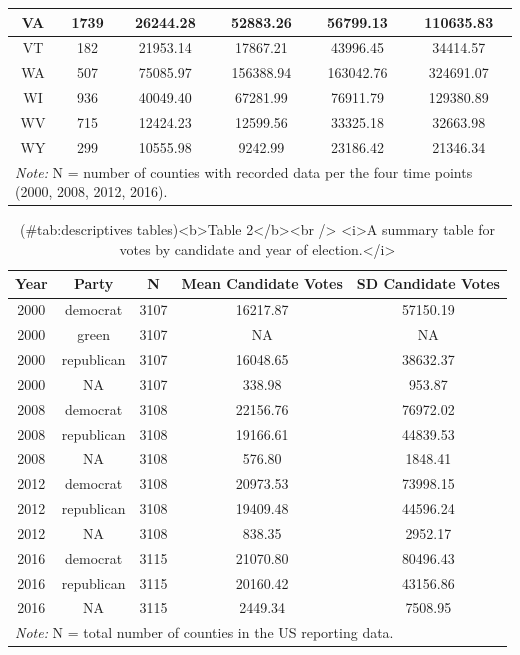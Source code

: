\documentclass[
  english,
  man]{apa6}
\begin{document}
\begin{table}
\begin{tabular}[t]{c|c|c|c|c|c}
VA & 1739 & 26244.28 & 52883.26 & 56799.13 & 110635.83\\
\hline
VT & 182 & 21953.14 & 17867.21 & 43996.45 & 34414.57\\
\hline
WA & 507 & 75085.97 & 156388.94 & 163042.76 & 324691.07\\
\hline
WI & 936 & 40049.40 & 67281.99 & 76911.79 & 129380.89\\
\hline
WV & 715 & 12424.23 & 12599.56 & 33325.18 & 32663.98\\
\hline
WY & 299 & 10555.98 & 9242.99 & 23186.42 & 21346.34\\
\hline
\multicolumn{6}{l}{\rule{0pt}{1em}\textit{Note: } N = number of counties with recorded data per the four time points (2000, 2008, 2012, 2016).}\\
\end{tabular}
\end{table}

\begin{table}

\caption{(\#tab:descriptives tables)<b>Table 2</b><br /> <i>A summary table for votes by candidate and year of election.</i>}
\centering
\begin{tabular}[t]{c|c|c|c|c}
\hline
Year & Party & N & Mean Candidate Votes & SD Candidate Votes\\
\hline
2000 & democrat & 3107 & 16217.87 & 57150.19\\
\hline
2000 & green & 3107 & NA & NA\\
\hline
2000 & republican & 3107 & 16048.65 & 38632.37\\
\hline
2000 & NA & 3107 & 338.98 & 953.87\\
\hline
2008 & democrat & 3108 & 22156.76 & 76972.02\\
\hline
2008 & republican & 3108 & 19166.61 & 44839.53\\
\hline
2008 & NA & 3108 & 576.80 & 1848.41\\
\hline
2012 & democrat & 3108 & 20973.53 & 73998.15\\
\hline
2012 & republican & 3108 & 19409.48 & 44596.24\\
\hline
2012 & NA & 3108 & 838.35 & 2952.17\\
\hline
2016 & democrat & 3115 & 21070.80 & 80496.43\\
\hline
2016 & republican & 3115 & 20160.42 & 43156.86\\
\hline
2016 & NA & 3115 & 2449.34 & 7508.95\\
\hline
\multicolumn{5}{l}{\rule{0pt}{1em}\textit{Note: } N = total number of counties in the US reporting data.}\\
\end{tabular}
\end{table}
\end{document}
